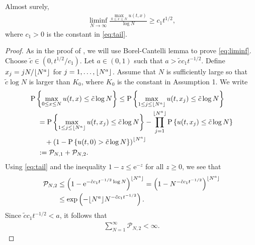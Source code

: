 \documentclass[12pt, reqno]{amsart}
\renewcommand{\P}{\mathrm{P}}
\newcommand{\<}{\langle}
\renewcommand{\>}{\rangle}
\newcommand{\e}{\mathrm{e}}
\DeclarePairedDelimiter\floor{\lfloor}{\rfloor}
\begin{document}
\begin{proposition}
           Almost surely,
          \begin{align}\label{eq:liminf}
        \liminf_{N\to\infty} \frac{\max_{0\leq x\leq N}u(t,x)}{\log N} \geq c_1 t^{1/2},
     \end{align}
     where $c_1>0$ is the constant in \eqref{eq:tail}.
\end{proposition}
\begin{proof} 
            As in the proof of \cite[Theorem 1.1]{CJK13}, we will use Borel-Cantelli lemma to prove \eqref{eq:liminf}.
           Choose $\tilde{c}\in (0, t^{1/2}/c_1)$.  Let $a\in (0, 1)$ such that
           $a>\tilde{c}c_1 t^{-1/2}$. Define $x_j= j N/\floor{N^a}$ for $j= 1, \ldots, \floor{N^a}$.
           Assume that $N$ is sufficiently large so that $\tilde{c}\log N$ is larger than $K_0$, where $K_0$ is the constant in 
           Assumption 1.
           We write
           \begin{align*}
           &\P\left\{ \max_{0\leq x\leq N} u(t,x)  \leq \tilde{c} \log N\right\} \leq           
            \P\left\{ \max_{1\leq j\leq \floor{N^a}} u(t,x_j)  \leq \tilde{c} \log N\right\}\\
            &\quad =            \P\left\{ \max_{1\leq j\leq \floor{N^a}} u(t,x_j)  \leq \tilde{c} \log N\right\}
            -\prod_{j=1}^{\floor{N^a}}\P\left\{u(t,x_j)  \leq \tilde{c} \log N\right\}\\
            &\qquad + \left(1-\P\left\{u(t,0)  > \tilde{c} \log N\right\}\right)^{\floor{N^a}}\\
            &\quad :=\mathcal{P}_{N,1} + \mathcal{P}_{N,2}.
           \end{align*}
           Using \eqref{eq:tail} and the inequality $1-z \leq \e^{-z}$ for all $z\geq0$, we see that
           \begin{align*}
           \mathcal{P}_{N,2} &\leq \left(1- \e^{-\tilde{c}c_1t^{-1/2}\log N}\right)^{\floor{N^a}} = \left(1- N^{-\tilde{c}c_1t^{-1/2}}\right)^{\floor{N^a}}\\
           &\leq \exp\left(-\floor{N^a}N^{-\tilde{c}c_1t^{-1/2}}\right).
           \end{align*}
           Since $\tilde{c}c_1 t^{-1/2}<a$, it follows that
           \begin{align*}
           \sum_{N=1}^\infty \mathcal{P}_{N,2} <\infty.
           \end{align*}
           

\end{proof}
\end{document}
